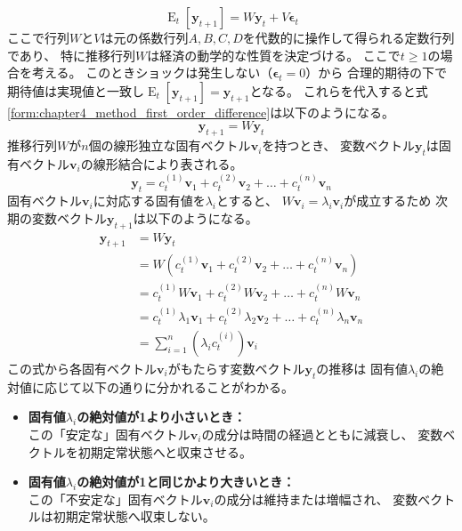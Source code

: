 \begin{equation}
\label{form:chapter4_method_first_order_difference}
    \operatorname{E}_t[\mathbf{y}_{t+1}]=W\mathbf{y}_t+V\mathbf{\epsilon}_t
\end{equation}
ここで行列\(W\)と\(V\)は元の係数行列\(A,B,C,D\)を代数的に操作して得られる定数行列であり、
特に推移行列\(W\)は経済の動学的な性質を決定づける。
ここで\(t\ge1\)の場合を考える。
このときショックは発生しない（\(\mathbf{\epsilon}_t=0\)）から
合理的期待の下で期待値は実現値と一致し\(\operatorname{E}_t[\mathbf{y}_{t+1}]=\mathbf{y}_{t+1}\)となる。
これらを代入すると式\eqref{form:chapter4_method_first_order_difference}は以下のようになる。
\begin{equation}
\label{form:chapter4_method_first_order_difference2}
    \mathbf{y}_{t+1}=W\mathbf{y}_t
\end{equation}
推移行列\(W\)が\(n\)個の線形独立な固有ベクトル\(\mathbf{v}_i\)を持つとき、
変数ベクトル\(\mathbf{y}_t\)は固有ベクトル\(\mathbf{v}_i\)の線形結合により表される。
\begin{equation}
\label{form:chapter4_method_eigen_sum_expanded}
    \mathbf{y}_t=c_t^{(1)}\mathbf{v}_1+c_t^{(2)}\mathbf{v}_2+\dots+c_t^{(n)}\mathbf{v}_n
\end{equation}
固有ベクトル\(\mathbf{v}_i\)に対応する固有値を\(\lambda_i\)とすると、
\(W\mathbf{v}_i=\lambda_i\mathbf{v}_i\)が成立するため
次期の変数ベクトル\(\mathbf{y}_{t+1}\)は以下のようになる。
\begin{align}
\label{form:chapter4_method_eigenvalue_derivation}
    \mathbf{y}_{t+1}
    &=W\mathbf{y}_t \nonumber \\
    &=W(c_t^{(1)}\mathbf{v}_1+c_t^{(2)}\mathbf{v}_2+\dots+c_t^{(n)}\mathbf{v}_n) \nonumber \\
    &=c_t^{(1)}W\mathbf{v}_1+c_t^{(2)}W\mathbf{v}_2+\dots+c_t^{(n)}W\mathbf{v}_n \nonumber \\
    &=c_t^{(1)}\lambda_1\mathbf{v}_1+c_t^{(2)}\lambda_2\mathbf{v}_2+\dots+c_t^{(n)}\lambda_n\mathbf{v}_n \nonumber \\
    &=\sum_{i=1}^n(\lambda_ic_t^{(i)})\mathbf{v}_i
\end{align}
この式から各固有ベクトル\(\mathbf{v}_i\)がもたらす変数ベクトル\(\mathbf{y}_t\)の推移は
固有値\(\lambda_i\)の絶対値に応じて以下の通りに分かれることがわかる。
\begin{itemize}
    \item 
    \label{itm:chapter4_method_stable_direction_final}
        \textbf{固有値\(\lambda_i\)の絶対値が1より小さいとき：}\\
        この「安定な」固有ベクトル\(\mathbf{v}_i\)の成分は時間の経過とともに減衰し、
        変数ベクトルを初期定常状態へと収束させる。
    \item
    \label{itm:chapter4_method_unstable_direction_final}
        \textbf{固有値\(\lambda_i\)の絶対値が1と同じかより大きいとき：}\\
        この「不安定な」固有ベクトル\(\mathbf{v}_i\)の成分は維持または増幅され、
        変数ベクトルは初期定常状態へ収束しない。
\end{itemize}
